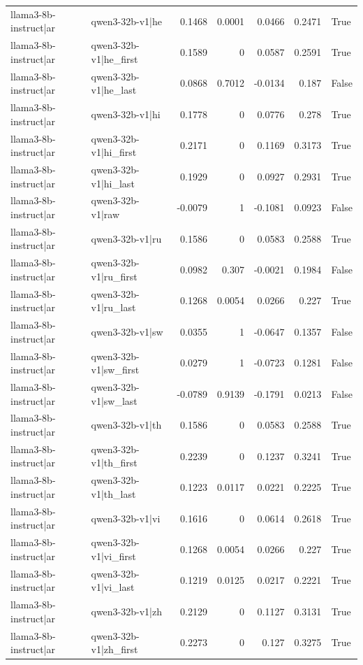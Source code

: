 \begin{table}
\begin{tabular}{l l r r r r l}
llama3-8b-instruct|ar & qwen3-32b-v1|he & 0.1468 & 0.0001 & 0.0466 & 0.2471 & True \\
llama3-8b-instruct|ar & qwen3-32b-v1|he_first & 0.1589 & 0 & 0.0587 & 0.2591 & True \\
llama3-8b-instruct|ar & qwen3-32b-v1|he_last & 0.0868 & 0.7012 & -0.0134 & 0.187 & False \\
llama3-8b-instruct|ar & qwen3-32b-v1|hi & 0.1778 & 0 & 0.0776 & 0.278 & True \\
llama3-8b-instruct|ar & qwen3-32b-v1|hi_first & 0.2171 & 0 & 0.1169 & 0.3173 & True \\
llama3-8b-instruct|ar & qwen3-32b-v1|hi_last & 0.1929 & 0 & 0.0927 & 0.2931 & True \\
llama3-8b-instruct|ar & qwen3-32b-v1|raw & -0.0079 & 1 & -0.1081 & 0.0923 & False \\
llama3-8b-instruct|ar & qwen3-32b-v1|ru & 0.1586 & 0 & 0.0583 & 0.2588 & True \\
llama3-8b-instruct|ar & qwen3-32b-v1|ru_first & 0.0982 & 0.307 & -0.0021 & 0.1984 & False \\
llama3-8b-instruct|ar & qwen3-32b-v1|ru_last & 0.1268 & 0.0054 & 0.0266 & 0.227 & True \\
llama3-8b-instruct|ar & qwen3-32b-v1|sw & 0.0355 & 1 & -0.0647 & 0.1357 & False \\
llama3-8b-instruct|ar & qwen3-32b-v1|sw_first & 0.0279 & 1 & -0.0723 & 0.1281 & False \\
llama3-8b-instruct|ar & qwen3-32b-v1|sw_last & -0.0789 & 0.9139 & -0.1791 & 0.0213 & False \\
llama3-8b-instruct|ar & qwen3-32b-v1|th & 0.1586 & 0 & 0.0583 & 0.2588 & True \\
llama3-8b-instruct|ar & qwen3-32b-v1|th_first & 0.2239 & 0 & 0.1237 & 0.3241 & True \\
llama3-8b-instruct|ar & qwen3-32b-v1|th_last & 0.1223 & 0.0117 & 0.0221 & 0.2225 & True \\
llama3-8b-instruct|ar & qwen3-32b-v1|vi & 0.1616 & 0 & 0.0614 & 0.2618 & True \\
llama3-8b-instruct|ar & qwen3-32b-v1|vi_first & 0.1268 & 0.0054 & 0.0266 & 0.227 & True \\
llama3-8b-instruct|ar & qwen3-32b-v1|vi_last & 0.1219 & 0.0125 & 0.0217 & 0.2221 & True \\
llama3-8b-instruct|ar & qwen3-32b-v1|zh & 0.2129 & 0 & 0.1127 & 0.3131 & True \\
llama3-8b-instruct|ar & qwen3-32b-v1|zh_first & 0.2273 & 0 & 0.127 & 0.3275 & True \\

\end{tabular}
\end{table}
